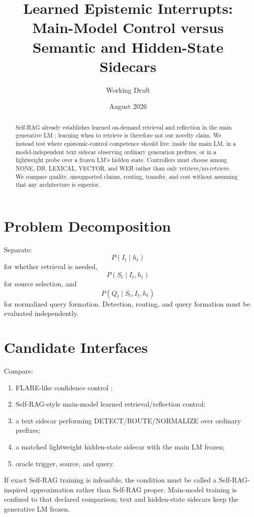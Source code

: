 \documentclass[11pt]{article}
\title{Learned Epistemic Interrupts: Main-Model Control versus Semantic and Hidden-State Sidecars}
\author{Working Draft}\date{August 2026}
\begin{document}
\maketitle
\begin{abstract}
Self-RAG already establishes learned on-demand retrieval and reflection in the
main generative LM \cite{selfrag}; learning when to retrieve is therefore not our
novelty claim. We instead test where epistemic-control competence should live:
inside the main LM, in a model-independent text sidecar observing ordinary
generation prefixes, or in a lightweight probe over a frozen LM's hidden state.
Controllers must choose among NONE, DB, LEXICAL, VECTOR, and WEB rather than
only retrieve/no-retrieve. We compare quality, unsupported claims, routing,
transfer, and cost without assuming that any architecture is superior.
\end{abstract}

\section{Problem Decomposition}
Separate:
\[
P(I_t\mid h_t)
\]
for whether retrieval is needed,
\[
P(S_t\mid I_t,h_t)
\]
for source selection, and
\[
P(Q_t\mid S_t,I_t,h_t)
\]
for normalized query formation. Detection, routing, and query formation must be evaluated independently.

\section{Candidate Interfaces}
Compare:
\begin{enumerate}
\item FLARE-like confidence control \cite{flare};
\item Self-RAG-style main-model learned retrieval/reflection control;
\item a text sidecar performing DETECT/ROUTE/NORMALIZE over ordinary prefixes;
\item a matched lightweight hidden-state sidecar with the main LM frozen;
\item oracle trigger, source, and query.
\end{enumerate}
If exact Self-RAG training is infeasible, the condition must be called a
Self-RAG-inspired approximation rather than Self-RAG proper. Main-model training
is confined to that declared comparison; text and hidden-state sidecars keep the
generative LM frozen.
\end{document}
